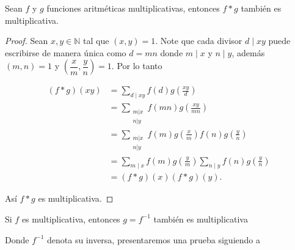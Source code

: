 \begin{theorem}
Sean $f$ y $g$ funciones aritméticas multiplicativas, entonces $f * g$ también es multiplicativa.
\end{theorem}

\begin{proof}
Sean $x, y \in \mathbb{N}$ tal que $(x, y)=1$. Note que cada divisor $d \mid xy$ puede escribirse de manera única como $d=mn$ donde $m \mid x$ y $n \mid y$, además $(m, n)=1$ y $\left(\dfrac{x}{m}, \dfrac{y}{n}\right)=1$. Por lo tanto

$$
\begin{aligned}
(f * g)(xy) & =\sum_{d \mid xy} f(d) g\left(\frac{xy}{d}\right) \\
& =\sum_{\substack{m|x \\
n| y}} f(mn) g\left(\frac{xy}{mn}\right) \\
& =\sum_{\substack{m|x \\
n| y}} f(m) g\left(\frac{x}{m}\right) f(n) g\left(\frac{y}{n}\right) \\
& =\sum_{m \mid x} f(m) g\left(\frac{y}{m}\right) \sum_{n \mid y} f(n) g\left(\frac{y}{n}\right) \\
& =(f * g)(x)(f * g)(y) .
\end{aligned}
$$

Así $f * g$ es multiplicativa.
\end{proof}


\begin{theorem}
Si $f$ es multiplicativa, entonces $g=f^{-1}$ también es multiplicativa
\end{theorem}

Donde $f^{-1}$ denota su inversa, presentaremos una prueba siguiendo a \cite{A.J.Hildebrand}\\

